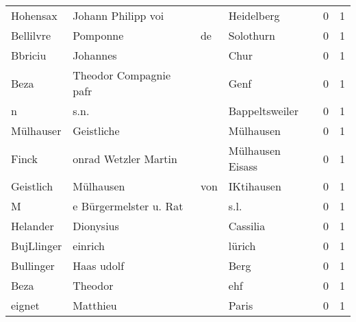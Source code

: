 \documentclass[10pt,a4paper,landscape]{article}
\begin{document}
\begin{longtable}{llllrr}
                 Hohensax &                 Johann Philipp voi &             &                                  Heidelberg &          0 &         1 \\
                Bellilvre &                           Pomponne &          de &                                   Solothurn &          0 &         1 \\
                  Bbriciu &                           Johannes &             &                                        Chur &          0 &         1 \\
                     Beza &             Theodor Compagnie pafr &             &                                        Genf &          0 &         1 \\
                        n &                               s.n. &             &                              Bappeltsweiler &          0 &         1 \\
                Mülhauser &                         Geistliche &             &                                   Mülhausen &          0 &         1 \\
                    Finck &               onrad Wetzler Martin &             &                            Mülhausen Eisass &          0 &         1 \\
                Geistlich &                          Mülhausen &         von &                                  IKtihausen &          0 &         1 \\
                        M &             e Bürgermelster u. Rat &             &                                        s.l. &          0 &         1 \\
                 Helander &                          Dionysius &             &                                    Cassilia &          0 &         1 \\
               BujLlinger &                            einrich &             &                                      lürich &          0 &         1 \\
                Bullinger &                         Haas udolf &             &                                        Berg &          0 &         1 \\
                     Beza &                            Theodor &             &                                         ehf &          0 &         1 \\
                   eignet &                           Matthieu &             &                                       Paris &          0 &         1 \\

\end{longtable}
\end{document}
